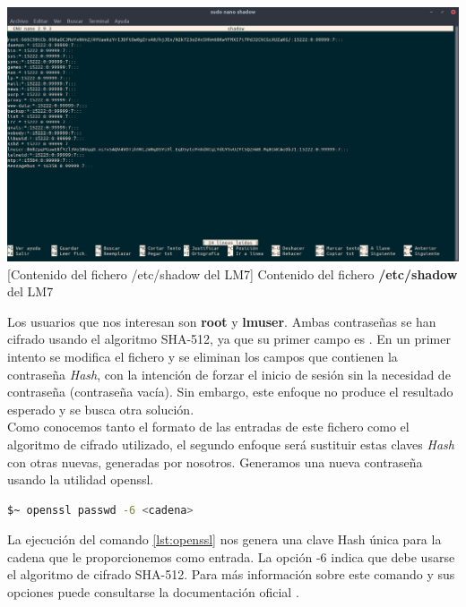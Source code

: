 \begin{center}
    \includegraphics[scale=0.25]{imagenes/shadow.png}
    [Contenido del fichero /etc/shadow del LM7]
    {Contenido del fichero \textbf{/etc/shadow} del \gls{LM7}}
    \label{img:shadow}
\end{center}

Los usuarios que nos interesan son \textbf{root} y \textbf{lmuser}. Ambas contraseñas se han cifrado usando el algoritmo SHA-512, ya que su primer campo es \textdollar. En un primer intento se modifica el fichero y se eliminan los campos que contienen la contraseña \textit{Hash}, con la intención de forzar el inicio de sesión sin la necesidad de contraseña (contraseña vacía). Sin embargo, este enfoque no produce el resultado esperado y se busca otra solución. \\ Como conocemos tanto el formato de las entradas de este fichero como el algoritmo de cifrado utilizado, el segundo enfoque será sustituir estas claves \textit{Hash} con otras nuevas, generadas por nosotros. Generamos una nueva contraseña usando la utilidad \gls{openssl}.\newline

\begin{lstlisting}[language=bash, label={lst:openssl}, caption={Generación de Hash usando cifrado SHA-512}]
    $~ openssl passwd -6 <cadena>
\end{lstlisting}

La ejecución del comando \ref{lst:openssl} nos genera una clave Hash única para la cadena que le proporcionemos como entrada. La opción -6 indica que debe usarse el algoritmo de cifrado SHA-512. Para más información sobre este comando y sus opciones puede consultarse la documentación oficial \cite{openssl}.

